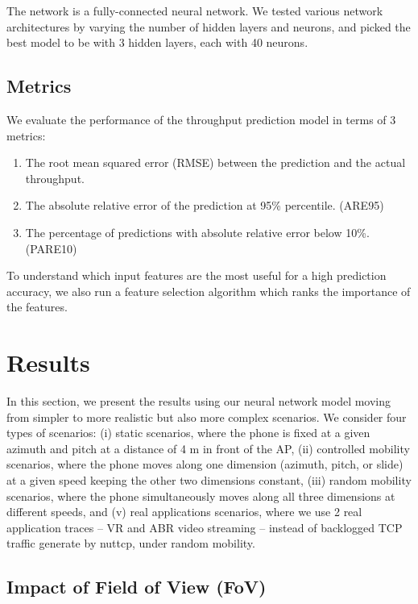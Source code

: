 \documentclass[sigconf,anonymous]{acmart}
\begin{document}
The network is a fully-connected neural network. We tested various network architectures by varying the number of hidden layers and neurons, and picked the best model to be with 3 hidden layers, each with 40 neurons.

\subsection{Metrics}
We evaluate the performance of the throughput prediction model in terms of 3 metrics:

\begin{enumerate}
    \item The root mean squared error (RMSE) between the prediction and the actual throughput.
    \item The absolute relative error of the prediction at 95\% percentile. (ARE95)
    \item The percentage of predictions with absolute relative error below 10\%. (PARE10)
\end{enumerate}

To understand which input features are the most useful for a high prediction accuracy, we also run a feature selection algorithm which ranks the importance of the features.

\section{Results} %
\label{section: Results}

In this section, we present the results using our neural network model moving from simpler to more realistic but also more complex scenarios. We consider four types of scenarios: (i) static scenarios, where the phone is fixed at a given azimuth and pitch at a distance of 4 m in front of the AP, (ii) controlled mobility scenarios, where the phone moves along one dimension (azimuth, pitch, or slide) at a given speed keeping the other two dimensions constant, (iii) random mobility scenarios, where the phone simultaneously moves along all three dimensions at different speeds, and (v) real applications scenarios, where we use 2 real application traces -- VR and ABR video streaming -- instead of backlogged TCP traffic generate by nuttcp, under random mobility. 

\subsection{Impact of Field of View (FoV)}
\end{document}
